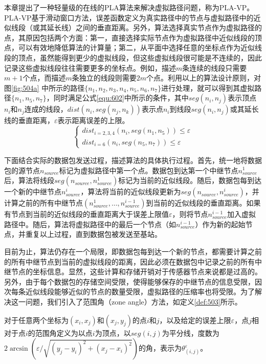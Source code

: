 本章提出了一种轻量级的在线的PLA算法来解决虚拟路径问题，称为PLA-VP。PLA-VP基于滑动窗口方法，误差函数定义为真实路径中的节点与虚拟路径中的近似线段（或其延长线）之间的垂直距离。另外，算法选择真实节点作为虚拟路径的点，其原因包括两个方面：第一，直接选择实际节点作为虚拟路径中近似线段的顶点，可以有效地降低算法的计算量；第二，从平面中选择任意的坐标点作为近似线段的顶点，虽然能得到更少的虚拟线段，但这些虚拟线段很可能是不连续的，因此记录这些虚拟线段往往需要更多的坐标点。例如，描述$m$条连续的线段只需要$m+1$个点，而描述$m$条独立的线段则需要$2m$个点。利用以上的算法设计原则，对图\ref{fig:504a} 中所示的路径${\{n_1,n_2,n_3,n_4,n_5,n_6,n_7\}}$进行处理，就可以得到其虚拟路径${\{n_1,n_5,n_7\}}$，同时满足公式\ref{equ:602}中所示的条件，其中$seg(n_i,n_j)$表示顶点$n_i$和$n_j$连成的线段，$dist(n_i,seg(n_j,n_k))$表示点$n_i$到线段$seg(n_i, n_j)$或其延长线的垂直距离，$\varepsilon$表示距离误差的上限。
\begin{equation}\label{equ:602}
\left\{\begin{array}{ll}
dist_{i={2,3,4}}(n_i,seg(n_1,n_5))\leq\varepsilon\\
dist_{i={6}}(n_i,seg(n_5,n_7))\leq\varepsilon
\end{array} \right.
\end{equation}

下面结合实际的数据包发送过程，描述算法的具体执行过程。首先，统一地将数据包的源节点$n_{source}$标记为虚拟路径中第一个点。数据包到达第一个中继节点$n_{source}^1$后，算法将线段$seg(n_{source}, n_{source}^1)$标记为当前的近似线段。随后，数据包每到达一个新的中继节点$n_{source}^i$，算法将当前的近似线段更新为$seg(n_{source},n_{source}^i)$，并计算之前的所有中继节点$(n_{source}^1,\ldots,n_{source}^{i-1})$到当前的近似线段的垂直距离。如果有节点到当前的近似线段的垂直距离大于误差上限值$\varepsilon$，则将节点$n_{source}^{i-1}$加入虚拟路径中。随后，算法将虚拟路径中的最后一个节点（如$n_{source}^{i-1}$）作为新的起始节点，并重复以上过程，直到数据包被发送至基站。

目前为止，算法仍存在一个局限，即数据包每到达一个新的节点，都需要计算之前的所有中继节点到当前的虚拟线段的距离，因此必须在数据包中记录之前的所有中继节点的坐标信息。显然，这些计算和存储开销对于传感器节点来说都是过高的。另外，由于每个数据包的存储空间受限，使得能够保存的中继节点的信息受限，因次每条近似线段能够近似的节点的数量受限，虚拟路径的压缩率也将受限。为了解决这一问题，我们引入了范围角（zone angle）方法，如定义\ref{def:503}所示。
\begin{definition}\label{def:503}
对于任意两个坐标为$(x_i,x_j)$和$(x_j,y_j)$的点$i$和$j$，以及给定的误差上限$\varepsilon$，点$j$相对于点$i$的范围角定义为以点$i$为顶点，以$seg(i,j)$为平分线，度数为$2\arcsin(\varepsilon/\sqrt{(y_j-y_i)^2+(x_j-x_i)^2})$的角，表示为$\theta_{(i,j)}^{\varepsilon}$。
\end{definition}


